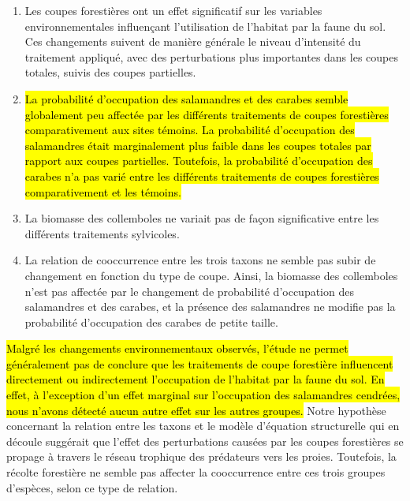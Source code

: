 \begin{enumerate}
  \item Les coupes forestières ont un effet significatif sur les variables environnementales influençant l'utilisation de l'habitat par la faune du sol. Ces changements suivent de manière générale le niveau d'intensité du traitement appliqué, avec des perturbations plus importantes dans les coupes totales, suivis des coupes partielles.
  \item \hl{La probabilité d’occupation des salamandres et des carabes semble globalement peu affectée par les différents traitements de coupes forestières comparativement aux sites témoins. La probabilité d’occupation des salamandres était marginalement plus faible dans les coupes totales par rapport aux coupes partielles. Toutefois, la probabilité d’occupation des carabes n’a pas varié entre les différents traitements de coupes forestières comparativement et les témoins. }
  \item La biomasse des collemboles ne variait pas de façon significative entre les différents traitements sylvicoles.
  \item La relation de cooccurrence entre les trois taxons ne semble pas subir de changement en fonction du type de coupe. Ainsi, la biomasse des collemboles n'est pas affectée par le changement de probabilité d'occupation des salamandres et des carabes, et la présence des salamandres ne modifie pas la probabilité d'occupation des carabes de petite taille.
\end{enumerate}

 
\hl{Malgré les changements environnementaux observés, l'étude ne permet généralement pas de conclure que les traitements de coupe forestière influencent directement ou indirectement l’occupation de l’habitat par la faune du sol. 
En effet, à l’exception d’un effet marginal sur l’occupation des salamandres cendrées, nous n’avons détecté aucun autre effet sur les autres groupes. }
Notre hypothèse concernant la relation entre les taxons et le modèle d'équation structurelle qui en découle suggérait que l'effet des perturbations causées par les coupes forestières se propage à travers le réseau trophique des prédateurs vers les proies. 
Toutefois, la récolte forestière ne semble pas affecter la cooccurrence entre ces trois groupes d'espèces, selon ce type de relation. 

